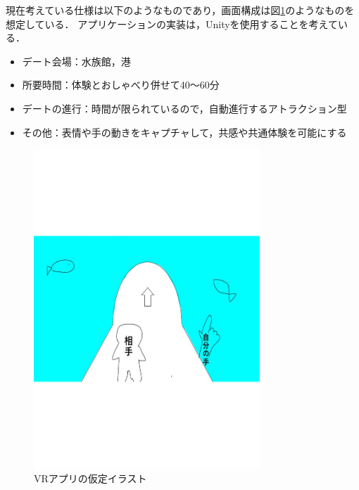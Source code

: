 \documentclass[12pt]{ltjsarticle}
\begin{document}
現在考えている仕様は以下のようなものであり，画面構成は図\ref{fig:イラスト}のようなものを想定している．
アプリケーションの実装は，Unityを使用することを考えている．

\begin{itemize}
\item デート会場：水族館，港
\item 所要時間：体験とおしゃべり併せて40〜60分
\item デートの進行：時間が限られているので，自動進行するアトラクション型
\item その他：表情や手の動きをキャプチャして，共感や共通体験を可能にする
\end{itemize}





\begin{figure}[h]
\begin{center}
 \includegraphics[width=85mm]{fig2.pdf}
\end{center}
 \caption{VRアプリの仮定イラスト}
 \label{fig:イラスト}
\end{figure}
\end{document}
